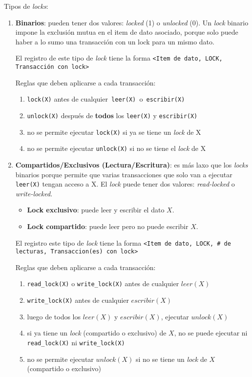 \documentclass[a4paper, twoside]{article}
\begin{document}
Tipos de \emph{locks}:
\begin{enumerate}
	\item \textbf{Binarios}: pueden tener dos valores: \emph{locked} (1) o \emph{unlocked} (0). Un \emph{lock} binario impone la exclusión mutua en el item de dato asociado, porque solo puede haber a lo sumo una transacción con un lock para un mismo dato.

	El registro de este tipo de \emph{lock} tiene la forma \texttt{<Item de dato, LOCK, Transacción con lock>}

	Reglas que deben aplicarse a cada transacción:
	\begin{enumerate}
		\item \texttt{lock(X)} antes de cualquier\texttt{ leer(X) }o\texttt{ escribir(X)}
		\item \texttt{unlock(X)} después de \textbf{todos} los \texttt{leer(X)} y \texttt{escribir(X)}
		\item no se permite ejecutar \texttt{lock(X)} si ya se tiene un \emph{lock} de X
		\item no se permite ejecutar \texttt{unlock(X)} si no se tiene el \emph{lock} de X
	\end{enumerate}

	\item \textbf{Compartidos/Exclusivos (Lectura/Escritura)}: es más laxo que los \emph{locks} binarios porque permite que varias transacciones que solo van a ejecutar \texttt{leer(X)} tengan acceso a X. El \emph{lock} puede tener dos valores: \emph{read-locked} o \emph{write-locked}.
	\begin{itemize}
		\item \textbf{Lock exclusivo}: puede leer y escribir el dato $X$.
		\item \textbf{Lock compartido}: puede leer pero no puede escribir $X$.
	\end{itemize}

	El registro este tipo de \emph{lock} tiene la forma \texttt{<Item de dato, LOCK, \# de lecturas, Transaccion(es) con lock>}

	Reglas que deben aplicarse a cada transacción:
	\begin{enumerate}
		\item \texttt{read\_lock(X)} o \texttt{write\_lock(X)} antes de cualquier $leer(X)$
		\item \texttt{write\_lock(X)} antes de cualquier $escribir(X)$
		\item luego de todos los $leer(X)$ y $escribir(X)$, ejecutar $unlock(X)$
		\item si ya tiene un \emph{lock} (compartido o exclusivo) de $X$, no se puede ejecutar ni \texttt{read\_lock(X)} ni \texttt{write\_lock(X)}
		\item no se permite ejecutar $unlock(X)$ si no se tiene un \emph{lock} de $X$ (compartido o exclusivo)
	\end{enumerate}
\end{enumerate}
\end{document}
